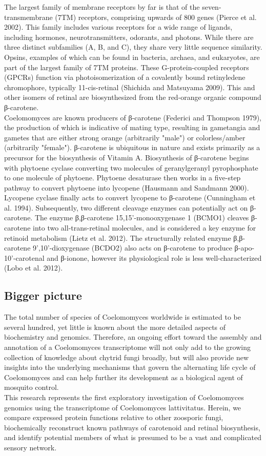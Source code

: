 \indent The largest family of membrane receptors by far is that of the seven-transmembrane (7TM) receptors, comprising upwards of 800 genes (Pierce et al. 2002). This family includes various receptors for a wide range of ligands, including hormones, neurotransmitters, odorants, and photons. While there are three distinct subfamilies (A, B, and C), they share very little sequence similarity. Opsins, examples of which can be found in bacteria, archaea, and eukaryotes, are part of the largest family of 7TM proteins. These G-protein-coupled receptors (GPCRs) function via photoisomerization of a covalently bound retinyledene chromophore, typically 11-cis-retinal (Shichida and Matsuyama 2009). This and other isomers of retinal are biosynthesized from the red-orange organic compound β-carotene. \\
 Coelomomyces are known producers of β-carotene (Federici and Thompson 1979), the production of which is indicative of mating type, resulting in gametangia and gametes that are either strong orange (arbitrarily "male") or colorless/amber (arbitrarily "female"). β-carotene is ubiquitous in nature and exists primarily as a precursor for the biosynthesis of Vitamin A. Biosynthesis of β-carotene begins with phytoene cyclase converting two molecules of geranylgeranyl pyrophosphate to one molecule of phytoene. Phytoene desaturase then works in a five-step pathway to convert phytoene into lycopene (Hausmann and Sandmann 2000). Lycopene cyclase finally acts to convert lycopene to β-carotene (Cunningham et al. 1994). Subsequently, two different cleavage enzymes can potentially act on β-carotene. The enzyme β,β-carotene 15,15'-monooxygenase 1 (BCMO1) cleaves β-carotene into two all-trans-retinal molecules, and is considered a key enzyme for retinoid metabolism (Lietz et al. 2012). The structurally related enzyme β,β-carotene 9',10'-dioxygenase (BCDO2) also acts on β-carotene to produce β-apo-10'-carotenal and β-ionone, however its physiological role is less well-characterized (Lobo et al. 2012).
\subsection{Bigger picture}
The total number of species of Coelomomyces worldwide is estimated to be several hundred, yet little is known about the more detailed aspects of biochemistry and genomics. Therefore, an ongoing effort toward the assembly and annotation of a Coelomomyces transcriptome will not only add to the growing collection of knowledge about chytrid fungi broadly, but will also provide new insights into the underlying mechanisms that govern the alternating life cycle of Coelomomyces and can help further its development as a biological agent of mosquito control. \\
\indent This research represents the first exploratory investigation of Coelomomyces genomics using the transcriptome of Coelomomyces lattivitatus. Herein, we compare expressed protein functions relative to other zoosporic fungi, biochemically reconstruct known pathways of carotenoid and retinal biosynthesis, and identify potential members of what is presumed to be a vast and complicated sensory network. \\
